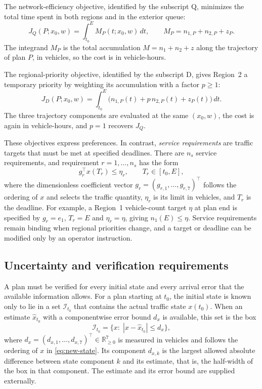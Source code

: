 \documentclass[final]{cas-sc}
\theoremstyle{definition}
\theoremstyle{plain}
\theoremstyle{definition}
\theoremstyle{plain}
\newcommand{\R}{\mathbb{R}}
\begin{document}
The network-efficiency objective, identified by the subscript Q,
minimizes the total time spent in both regions and in the exterior
queue:
\begin{equation}
J_Q(P;x_0,w)=\int_{t_0}^{E}M_P(t;x_0,w)\,dt,\qquad
M_P=n_{1,P}+n_{2,P}+z_P.
\label{eq:benchmark-queue-cost}
\end{equation}
The integrand $M_P$ is the total accumulation $M=n_1+n_2+z$ along the
trajectory of plan $P$, in vehicles, so the cost is in vehicle-hours.

The regional-priority objective, identified by the subscript D, gives
Region~2 a temporary priority by weighting its accumulation with a
factor $p\ge1$:
\begin{equation}
J_D(P;x_0,w)=\int_{t_0}^{E}
\big(n_{1,P}(t)+p\,n_{2,P}(t)+z_P(t)\big)\,dt.
\label{eq:benchmark-priority-cost}
\end{equation}
The three trajectory components are evaluated at the same $(x_0,w)$,
the cost is again in vehicle-hours, and $p=1$ recovers $J_Q$.

These objectives express preferences. In contrast, \emph{service
requirements} are traffic targets that must be met at specified
deadlines. There are $n_s$ service requirements, and requirement
$r=1,\ldots,n_s$ has the form
\begin{equation}
g_r^\top x(T_r)\le\eta_r,\qquad T_r\in[t_0,E],
\label{eq:new-service}
\end{equation}
where the dimensionless coefficient vector
$g_r=(g_{r,1},\ldots,g_{r,7})^\top$ follows the ordering of $x$ and
selects the traffic quantity, $\eta_r$ is its limit in vehicles, and
$T_r$ is the deadline. For example, a Region~1 vehicle-count target
$\eta$ at plan end is specified by $g_r=e_1$, $T_r=E$ and
$\eta_r=\eta$, giving $n_1(E)\le\eta$. Service requirements remain
binding when regional priorities change, and a target or deadline can
be modified only by an operator instruction.

\subsection{Uncertainty and verification requirements}
\label{sec:problem-uncertainty}

A plan must be verified for every initial state and every arrival
error that the available information allows. For a plan starting at
$t_0$, the initial state is known only to lie in a set
$\mathcal I_{t_0}$ that contains the actual traffic state $x(t_0)$.
When an estimate $\widehat x_{t_0}$ with a componentwise error bound
$d_x$ is available, this set is the box
\begin{equation}
\mathcal I_{t_0}=\{x:\;|x-\widehat x_{t_0}|\le d_x\},
\label{eq:benchmark-contract}
\end{equation}
where $d_x=(d_{x,1},\ldots,d_{x,7})^\top\in\R^7_{\ge0}$ is measured in
vehicles and follows the ordering of $x$ in
\eqref{eq:new-state}. Its component $d_{x,k}$ is the largest
allowed absolute difference between state component $k$ and its
estimate, that is, the half-width of the box in that component. The
estimate and its error bound are supplied externally.
\end{document}
